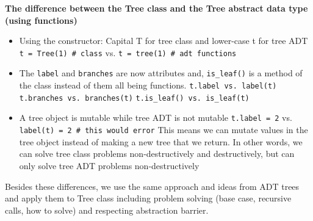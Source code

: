 \vspace{2mm}
\textbf{The difference between the Tree class and the Tree abstract data type (using functions)}
\begin{itemize}
\item Using the constructor: Capital T for tree class and lower-case t for tree ADT
    \subitem \lstinline{t = Tree(1) # class} vs. \lstinline{t = tree(1) # adt functions}
\item The \lstinline{label} and \lstinline{branches} are now attributes and, \lstinline{is_leaf()} is a method of the class instead of them all being functions.
    \subitem \lstinline{t.label vs. label(t)}
    \subitem \lstinline{t.branches vs. branches(t)}
    \subitem \lstinline{t.is_leaf() vs. is_leaf(t)}
\item A tree object is mutable while tree ADT is not mutable
    \subitem \lstinline{t.label = 2} vs. \lstinline{label(t) = 2 # this would error}
    \subitem This means we can mutate values in the tree object instead of making a new tree that we return. In other words, we can solve tree class problems non-destructively and destructively, but can only solve tree ADT problems non-destructively
\end{itemize}
Besides these differences, we use the same approach and ideas from ADT trees and apply them to Tree class including problem solving (base case, recursive calls, how to solve)  and respecting abstraction barrier. 
